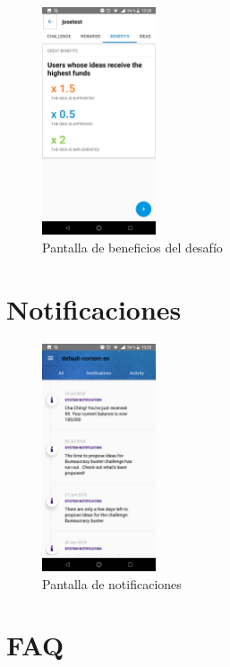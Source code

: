 \begin{figure}[!h]
	\begin{center}
		\includegraphics[width=0.3\textwidth]{./img/anexo1/ver_desafio_beneficios.png}
		\caption{Pantalla de beneficios del desafío}
		\label{fig:ver_desafio_inicio_beneficios}
	\end{center}
\end{figure}


\section{Notificaciones}

\begin{figure}[!h]
	\begin{center}
		\includegraphics[width=0.3\textwidth]{./img/anexo1/notificaciones_all.png}
		\caption{Pantalla de notificaciones}
		\label{fig:notificaciones}
	\end{center}
\end{figure}

\section{FAQ}
